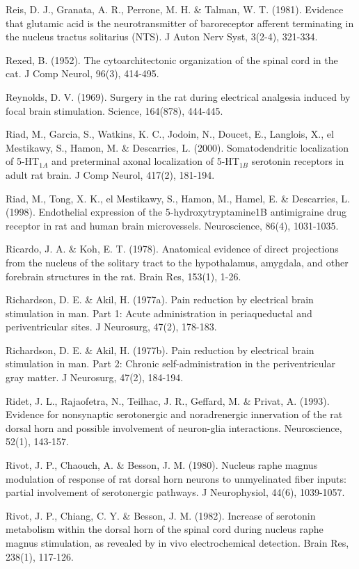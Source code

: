\documentclass[a4paper,12pt,twoside]{report}
\begin{document}
\begin{singlespacing}
\begin{footnotesize}
Reis, D. J., Granata, A. R., Perrone, M. H. \& Talman, W. T. (1981). Evidence that glutamic acid is the neurotransmitter of baroreceptor afferent terminating in the nucleus tractus solitarius (NTS). J Auton Nerv Syst, 3(2-4), 321-334.

Rexed, B. (1952). The cytoarchitectonic organization of the spinal cord in the cat. J Comp Neurol, 96(3), 414-495.

Reynolds, D. V. (1969). Surgery in the rat during electrical analgesia induced by focal brain stimulation. Science, 164(878), 444-445.

Riad, M., Garcia, S., Watkins, K. C., Jodoin, N., Doucet, E., Langlois, X., el Mestikawy, S., Hamon, M. \& Descarries, L. (2000). Somatodendritic localization of 5-HT$_{1A}$ and preterminal axonal localization of 5-HT$_{1B}$ serotonin receptors in adult rat brain. J Comp Neurol, 417(2), 181-194.

Riad, M., Tong, X. K., el Mestikawy, S., Hamon, M., Hamel, E. \& Descarries, L. (1998). Endothelial expression of the 5-hydroxytryptamine1B antimigraine drug receptor in rat and human brain microvessels. Neuroscience, 86(4), 1031-1035.

Ricardo, J. A. \& Koh, E. T. (1978). Anatomical evidence of direct projections from the nucleus of the solitary tract to the hypothalamus, amygdala, and other forebrain structures in the rat. Brain Res, 153(1), 1-26.

Richardson, D. E. \& Akil, H. (1977a). Pain reduction by electrical brain stimulation in man. Part 1: Acute administration in periaqueductal and periventricular sites. J Neurosurg, 47(2), 178-183.

Richardson, D. E. \& Akil, H. (1977b). Pain reduction by electrical brain stimulation in man. Part 2: Chronic self-administration in the periventricular gray matter. J Neurosurg, 47(2), 184-194.

Ridet, J. L., Rajaofetra, N., Teilhac, J. R., Geffard, M. \& Privat, A. (1993). Evidence for nonsynaptic serotonergic and noradrenergic innervation of the rat dorsal horn and possible involvement of neuron-glia interactions. Neuroscience, 52(1), 143-157.

Rivot, J. P., Chaouch, A. \& Besson, J. M. (1980). Nucleus raphe magnus modulation of response of rat dorsal horn neurons to unmyelinated fiber inputs: partial involvement of serotonergic pathways. J Neurophysiol, 44(6), 1039-1057.

Rivot, J. P., Chiang, C. Y. \& Besson, J. M. (1982). Increase of serotonin metabolism within the dorsal horn of the spinal cord during nucleus raphe magnus stimulation, as revealed by in vivo electrochemical detection. Brain Res, 238(1), 117-126.


\end{footnotesize}
\end{singlespacing}
\end{document}

